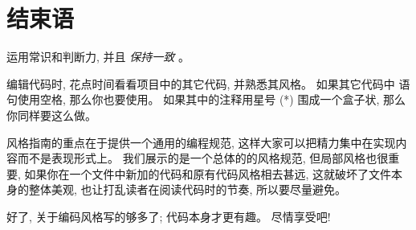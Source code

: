 \chapter{结束语}

运用常识和判断力, 并且 \emph{保持一致} 。

编辑代码时, 花点时间看看项目中的其它代码, 并熟悉其风格。 如果其它代码中  语句使用空格, 那么你也要使用。 如果其中的注释用星号 (*) 围成一个盒子状, 那么你同样要这么做。

风格指南的重点在于提供一个通用的编程规范, 这样大家可以把精力集中在实现内容而不是表现形式上。 我们展示的是一个总体的的风格规范, 但局部风格也很重要, 如果你在一个文件中新加的代码和原有代码风格相去甚远, 这就破坏了文件本身的整体美观, 也让打乱读者在阅读代码时的节奏, 所以要尽量避免。

好了, 关于编码风格写的够多了; 代码本身才更有趣。 尽情享受吧!
